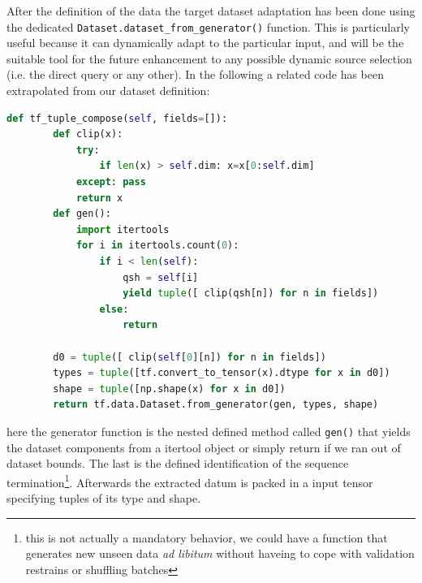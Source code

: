 After the definition of the data the target \TF dataset adaptation has been done using the dedicated \TF \verb|Dataset.dataset_from_generator()| function. This is particularly useful because it can dynamically adapt to the particular input, and will be the suitable tool for the future enhancement to any possible dynamic source selection (i.e. the direct \MDSplus query or any other).
In the following a related code has been extrapolated from our dataset definition:
%
\begin{lstlisting}[language=Python, caption=Dataset from generator]
    def tf_tuple_compose(self, fields=[]):
        def clip(x):
            try: 
                if len(x) > self.dim: x=x[0:self.dim]
            except: pass
            return x
        def gen():
            import itertools
            for i in itertools.count(0):
                if i < len(self):
                    qsh = self[i]
                    yield tuple([ clip(qsh[n]) for n in fields])
                else:
                    return

        d0 = tuple([ clip(self[0][n]) for n in fields])
        types = tuple([tf.convert_to_tensor(x).dtype for x in d0])
        shape = tuple([np.shape(x) for x in d0])
        return tf.data.Dataset.from_generator(gen, types, shape)
\end{lstlisting}
%
here the generator function is the nested defined method called \verb|gen()| that yields the dataset components from a itertool object or simply return if we ran out of dataset bounds. The last is the defined identification of the sequence termination\footnote{this is not actually a mandatory behavior, we could have a function that generates new unseen data \textit{ad libitum} without haveing to cope with validation restrains or shuffling batches}.
Afterwards the extracted datum is packed in a \TF input tensor specifying tuples of its type and shape.

